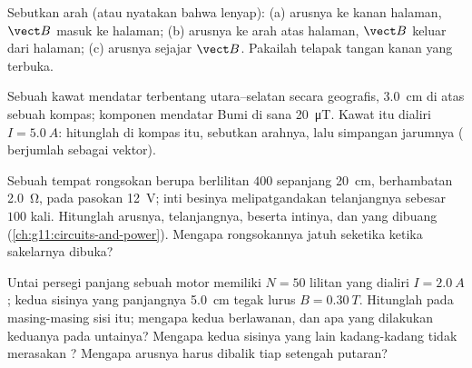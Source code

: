 \begin{exercise}[$\star\star$]\label{exo:g11:magnetic-fields:11}
Sebutkan arah  (atau nyatakan bahwa  lenyap):
(a) arusnya ke kanan halaman, $\vect B$ masuk ke halaman;
(b) arusnya ke arah atas halaman, $\vect B$ keluar dari halaman;
(c) arusnya sejajar $\vect B$. Pakailah telapak tangan kanan yang
terbuka.
\end{exercise}

\begin{exercise}[$\star\star\star$]\label{exo:g11:magnetic-fields:12}
Sebuah kawat mendatar terbentang utara--selatan secara geografis,
\qty{3.0}{cm} di atas sebuah kompas; komponen mendatar  Bumi di
sana \qty{20}{\micro T}. Kawat itu dialiri $I = \qty{5.0}{A}$:
hitunglah  di kompas itu, sebutkan arahnya, lalu simpangan
jarumnya ( berjumlah sebagai vektor).
\end{exercise}

\begin{exercise}[$\star\star\star$]\label{exo:g11:magnetic-fields:13}
Sebuah  tempat rongsokan berupa  berlilitan $400$
sepanjang \qty{20}{cm}, berhambatan \qty{2.0}{\ohm}, pada pasokan
\qty{12}{V}; inti besinya melipatgandakan  telanjangnya sebesar
$100$ kali. Hitunglah arusnya,   telanjangnya, 
beserta intinya, dan  yang dibuang 
(\cref{ch:g11:circuits-and-power}). Mengapa rongsokannya jatuh seketika
ketika sakelarnya dibuka?
\end{exercise}

\begin{exercise}[$\star\star\star$]\label{exo:g11:magnetic-fields:14}
Untai persegi panjang sebuah motor memiliki $N = 50$ lilitan yang
dialiri $I = \qty{2.0}{A}$; kedua sisinya yang panjangnya \qty{5.0}{cm}
tegak lurus  $B = \qty{0.30}{T}$. Hitunglah  pada
masing-masing sisi itu; mengapa kedua  berlawanan, dan apa yang
dilakukan keduanya pada untainya? Mengapa kedua sisinya yang lain
kadang-kadang tidak merasakan ? Mengapa arusnya harus dibalik tiap
setengah putaran?
\end{exercise}

